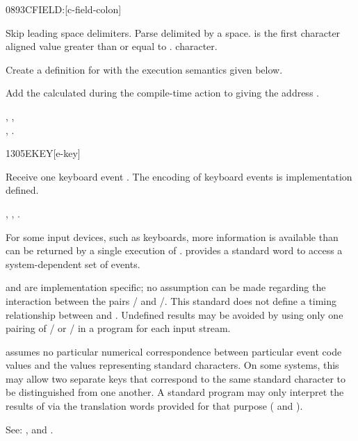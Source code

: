 \enlargethispage{4ex}
\begin{worddef}{0893}{CFIELD:}[c-field-colon]%
\item {}

	Skip leading space delimiters. Parse  delimited by
	a space.  is the first character aligned value
	greater than or equal to .  
	character.

	Create a definition for  with the execution semantics
	given below.

\execute[name]

	Add the  calculated during the compile-time action to
	 giving the address .

\see {},
	, \\
	,
	.
\end{worddef}


\begin{worddef}{1305}{EKEY}[e-key]
\item {}

	Receive one keyboard event . The encoding of keyboard events
	is implementation defined.

\see {},
	,
	.


	\begin{rationale} %
		For some input devices, such as keyboards, more information is
		available than can be returned by a single execution of
		.   provides a standard word to access a
		system-dependent set of events.

		 and  are implementation specific; no
		assumption can be made regarding the interaction between the
		pairs / and /.
		This standard does not define a timing relationship between
		 and .  Undefined results may be
		avoided by using only one pairing of / 
		or / in a program for each input
		stream.

		 assumes no particular numerical correspondence
		between particular event code values and the values
		representing standard characters.  On some systems, this may
		allow two separate keys that correspond to the same standard
		character to be distinguished from one another.  A standard
		program may only interpret the results of  via the
		translation words provided for that purpose
		( and ).

		See: ,  and
		.
	\end{rationale}
\end{worddef}


